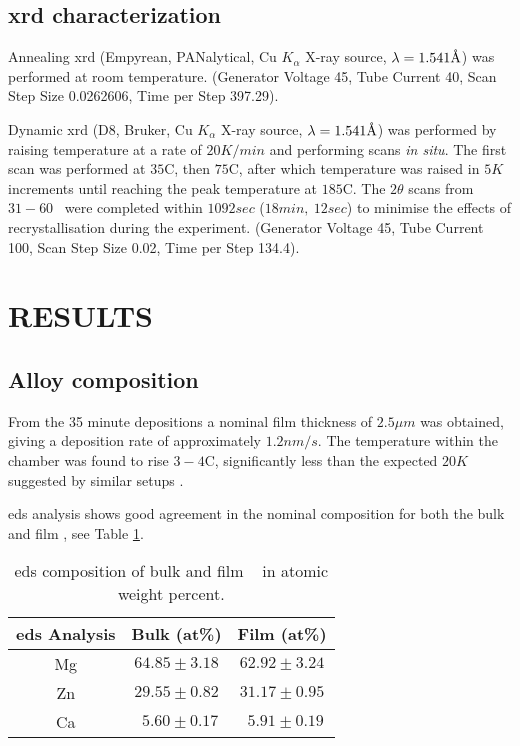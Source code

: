 \documentclass[a4paper,12pt,oneside]{article}%
\begin{document}
\subsection{\acrshort{xrd} characterization}
Annealing \acrshort{xrd} (Empyrean, PANalytical, Cu $K_{\alpha}$ X-ray source, $\lambda = 1.541 \mbox{\normalfont\AA}$) was performed at room temperature. 
(Generator Voltage 45, Tube Current 40, Scan Step Size 0.0262606, Time per Step 397.29). 

Dynamic \acrshort{xrd} (D8, Bruker, Cu $K_{\alpha}$ X-ray source, $\lambda = 1.541 \mbox{\normalfont\AA}$) was performed by raising temperature at a rate of $20 K/min$ and performing scans \textit{in situ}. The first scan was performed at $35$\degree C, then $75$\degree C, after which temperature was raised in $5K$ increments until reaching the peak temperature at $185$\degree C. The $2 \theta$ scans from $31 - 60$\degree~ were completed within $1092 sec$ ($18min,~ 12sec$) to minimise the effects of recrystallisation during the experiment. 
(Generator Voltage 45, Tube Current 100, Scan Step Size 0.02, Time per Step 134.4). 


\section{RESULTS}
\subsection{Alloy composition}

From the 35 minute depositions a nominal film thickness of $2.5 \mu m$ was obtained, giving a deposition rate of approximately $1.2 nm/s$. The temperature within the chamber was found to rise $3 - 4$\degree C, significantly less than the expected $20K$ suggested by similar setups \cite{Wang2014}.

\acrshort{eds} analysis shows good agreement in the nominal composition for both the bulk and film \MgZnCa, see Table \ref{tab:EDS_Composition}.

\begin{table}[h]
	\centering
	\begin{tabular}{ c c c }
		\toprule
		\acrshort{eds} Analysis & Bulk (at\%)  & Film (at\%)  \\
		\midrule
		Mg & $64.85 \pm 3.18$ & $62.92 \pm 3.24$ \\
		Zn & $29.55 \pm 0.82$ & $31.17 \pm 0.95$ \\
		Ca & $~~ 5.60 \pm 0.17$ & $~~ 5.91 \pm 0.19$ \\ 
		\bottomrule
	\end{tabular}
	\caption{\acrshort{eds} composition of bulk and film \MgZnCa~ in atomic weight percent.}
	\label{tab:EDS_Composition}
\end{table}
\end{document}
